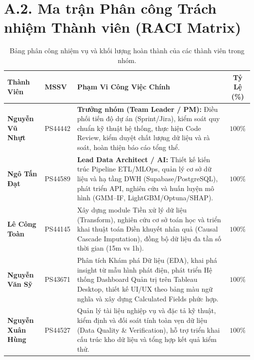 \documentclass[12pt, a4paper]{report}
\begin{document}
\section*{A.2. Ma trận Phân công Trách nhiệm Thành viên (RACI Matrix)}

\begin{table}[H]
\centering
\small
\renewcommand{\arraystretch}{1.25}
\begin{tabularx}{\textwidth}{@{} l l X c @{}}
\toprule
\textbf{Thành Viên} & \textbf{MSSV} & \textbf{Phạm Vi Công Việc Chính} & \textbf{Tỷ Lệ (\%)} \\
\midrule
\textbf{Nguyễn Vũ Nhựt} & PS44442 & 
\textbf{Trưởng nhóm (Team Leader / PM):} Điều phối tiến độ dự án (Sprint/Jira), kiểm soát quy chuẩn kỹ thuật hệ thống, thực hiện Code Review, kiểm duyệt chất lượng dữ liệu và rà soát, hoàn thiện báo cáo tổng thể. & 
$100\%$ \\
\midrule
\textbf{Ngô Tấn Đạt} & PS44589 & 
\textbf{Lead Data Architect / AI:} Thiết kế kiến trúc Pipeline ETL/MLOps, quản lý cơ sở dữ liệu và hạ tầng DWH (Supabase/PostgreSQL), phát triển API, nghiên cứu và huấn luyện mô hình (GMM--IF, LightGBM/Optuna/SHAP). & 
$100\%$ \\
\midrule
\textbf{Lê Công Toàn} & PS44145 & 
Xây dựng module Tiền xử lý dữ liệu (Transform), nghiên cứu cơ sở toán học và triển khai thuật toán Điền khuyết nhân quả (Causal Cascade Imputation), đồng bộ dữ liệu đa tần số thời gian (15m vs 1h). & 
$100\%$ \\
\midrule
\textbf{Nguyễn Văn Sỹ} & PS43671 & 
Phân tích Khám phá Dữ liệu (EDA), khai phá insight từ mẫu hình phát điện, phát triển Hệ thống Dashboard Quản trị trên Tableau Desktop, thiết kế UI/UX theo bảng màu ngữ nghĩa và xây dựng Calculated Fields phức hợp. & 
$100\%$ \\
\midrule
\textbf{Nguyễn Xuân Hùng} & PS44527 & 
Quản lý tài liệu nghiệp vụ và đặc tả kỹ thuật, kiểm định và đối soát tính toàn vẹn dữ liệu (Data Quality \& Verification), hỗ trợ triển khai cấu trúc kho dữ liệu và tổng hợp kết quả kiểm thử. & 
$100\%$ \\
\bottomrule
\end{tabularx}
\caption{Bảng phân công nhiệm vụ và khối lượng hoàn thành của các thành viên trong nhóm.}
\label{tab:member_assignment}
\end{table}

\end{document}

